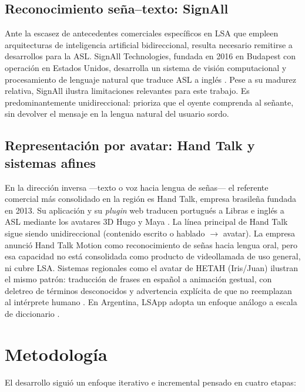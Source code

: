 \documentclass[12pt,a4paper]{report}
\begin{document}
\subsection{Reconocimiento seña--texto: SignAll}
Ante la escasez de antecedentes comerciales específicos en LSA que empleen arquitecturas de inteligencia artificial bidireccional, resulta necesario remitirse a desarrollos para la ASL. SignAll Technologies, fundada en 2016 en Budapest con operación en Estados Unidos, desarrolla un sistema de visión computacional y procesamiento de lenguaje natural que traduce ASL a inglés \parencite{signall2026linkedin,signall2018techcrunch}.
Pese a su madurez relativa, SignAll ilustra limitaciones relevantes para este trabajo. Es predominantemente unidireccional: prioriza que el oyente comprenda al señante, sin devolver el mensaje en la lengua natural del usuario sordo.

\subsection{Representación por avatar: Hand Talk y sistemas afines}
En la dirección inversa ---texto o voz hacia lengua de señas--- el referente comercial más consolidado en la región es Hand Talk, empresa brasileña fundada en 2013. Su aplicación y su \textit{plugin} web traducen portugués a Libras e inglés a ASL mediante los avatares 3D Hugo y Maya \parencite{handtalk2025}.
La línea principal de Hand Talk sigue siendo unidireccional (contenido escrito o hablado $\rightarrow$ avatar). La empresa anunció Hand Talk Motion como reconocimiento de señas hacia lengua oral, pero esa capacidad no está consolidada como producto de videollamada de uso general, ni cubre LSA. Sistemas regionales como el avatar de HETAH (Iris/Juan) ilustran el mismo patrón: traducción de frases en español a animación gestual, con deletreo de términos desconocidos y advertencia explícita de que no reemplazan al intérprete humano \parencite{hetah2024avatar}. En Argentina, LSApp adopta un enfoque análogo a escala de diccionario \parencite{lsapp2018}.

\section{Metodología}
El desarrollo siguió un enfoque iterativo e incremental \parencite{pressman2014software} pensado en cuatro etapas:
\end{document}
